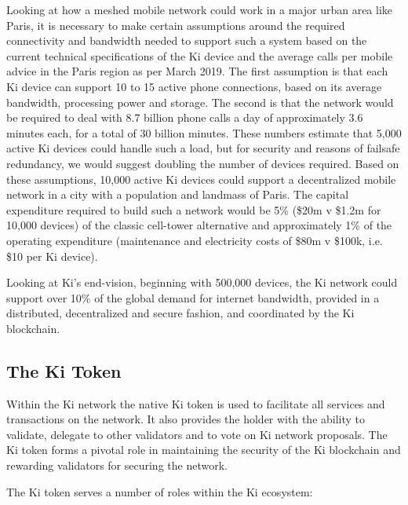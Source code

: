 Looking at how a meshed mobile network could work in a major urban area like Paris, it is necessary to make certain assumptions around the required connectivity and bandwidth needed to support such a system based on the current technical specifications of the Ki device and the average calls per mobile advice in the Paris region as per March 2019. The first assumption is that each Ki device can support 10 to 15 active phone connections, based on its average bandwidth, processing power and storage. The second is that the network would be required to deal with 8.7 billion phone calls a day of approximately 3.6 minutes each, for a total of 30 billion minutes. These numbers estimate that 5,000 active Ki devices could handle such a load, but for security and reasons of failsafe redundancy, we would suggest doubling the number of devices required. Based on these assumptions, 10,000 active Ki devices could support a decentralized mobile network in a city with a population and landmass of Paris. The capital expenditure required to build such a network would be 5\% (\$20m v \$1.2m for 10,000 devices) of the classic cell-tower alternative and approximately 1\% of the operating expenditure (maintenance and electricity costs of \$80m v \$100k, i.e. \$10 per Ki device).

Looking at Ki's end-vision, beginning with 500,000 devices, the Ki network could support over 10\% of the global demand for internet bandwidth,  provided in a distributed, decentralized and secure fashion, and coordinated by the Ki blockchain.




\subsection{The Ki Token}
\label{sec:kiecosystemtoken}
Within the Ki network the native Ki token is used to facilitate all services and transactions on the network. It also provides the holder with the ability to validate, delegate to other validators and to vote on Ki network proposals. The Ki token forms a pivotal role in maintaining the security of the Ki blockchain and rewarding validators for securing the network.

					
The Ki token serves a number of roles within the Ki ecosystem:

